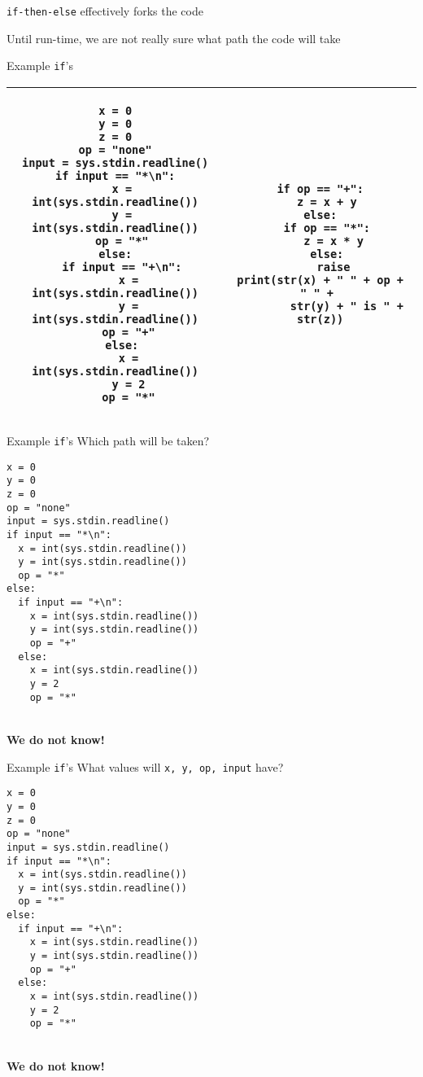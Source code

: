 \documentclass{beamer}
\begin{document}
\begin{slide}{
\item \texttt{if-then-else} effectively forks the code
\item Until run-time, we are not really sure what path the code will take
}\end{slide}

\begin{frame}[fragile]{Example \texttt{if}'s}
\begin{tabular}{| c | c |}
\hline
\begin{lstlisting}[basicstyle=\ttfamily\tiny]
x = 0
y = 0
z = 0
op = "none"
input = sys.stdin.readline()
if input == "*\n":
  x = int(sys.stdin.readline())
  y = int(sys.stdin.readline())
  op = "*"
else:
  if input == "+\n":
    x = int(sys.stdin.readline())
    y = int(sys.stdin.readline())
    op = "+"
  else:
    x = int(sys.stdin.readline())
    y = 2
    op = "*"
\end{lstlisting}
&
\begin{lstlisting}[basicstyle=\ttfamily\tiny]
if op == "+":
  z = x + y
else:
  if op == "*":
    z = x * y
  else:
    raise
print(str(x) + " " + op + " " + 
        str(y) + " is " + str(z))
\end{lstlisting} \\
\hline
\end{tabular}
\end{frame}

\begin{frame}[fragile]{Example \texttt{if}'s}
Which path will be taken?
\begin{lstlisting}[frame=shadowbox,basicstyle=\ttfamily\tiny]
x = 0
y = 0
z = 0
op = "none"
input = sys.stdin.readline()
if input == "*\n":
  x = int(sys.stdin.readline())
  y = int(sys.stdin.readline())
  op = "*"
else:
  if input == "+\n":
    x = int(sys.stdin.readline())
    y = int(sys.stdin.readline())
    op = "+"
  else:
    x = int(sys.stdin.readline())
    y = 2
    op = "*"
\end{lstlisting}

\pause

\ \\

\textbf{We do not know!}
\end{frame}

\begin{frame}[fragile]{Example \texttt{if}'s}
What values will \texttt{x, y, op, input} have?
\begin{lstlisting}[frame=shadowbox,basicstyle=\ttfamily\tiny]
x = 0
y = 0
z = 0
op = "none"
input = sys.stdin.readline()
if input == "*\n":
  x = int(sys.stdin.readline())
  y = int(sys.stdin.readline())
  op = "*"
else:
  if input == "+\n":
    x = int(sys.stdin.readline())
    y = int(sys.stdin.readline())
    op = "+"
  else:
    x = int(sys.stdin.readline())
    y = 2
    op = "*"
\end{lstlisting}

\pause

\ \\

\textbf{We do not know!}
\end{frame}
\end{document}
